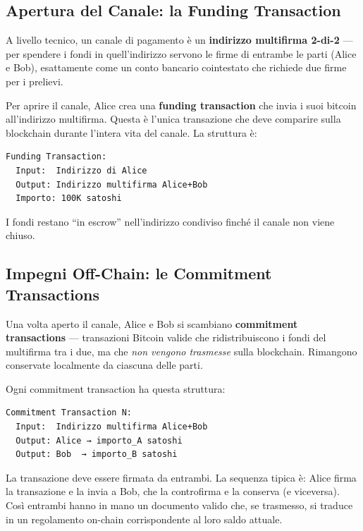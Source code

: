 \documentclass[
  italian,
  openany]{book}
\begin{document}
\subsection{Apertura del Canale: la Funding
Transaction}\label{apertura-del-canale-la-funding-transaction}

A livello tecnico, un canale di pagamento è un \textbf{indirizzo
multifirma 2-di-2} --- per spendere i fondi in quell'indirizzo servono
le firme di entrambe le parti (Alice e Bob), esattamente come un conto
bancario cointestato che richiede due firme per i prelievi.

Per aprire il canale, Alice crea una \textbf{funding transaction} che
invia i suoi bitcoin all'indirizzo multifirma. Questa è l'unica
transazione che deve comparire sulla blockchain durante l'intera vita
del canale. La struttura è:

\begin{verbatim}
Funding Transaction:
  Input:  Indirizzo di Alice
  Output: Indirizzo multifirma Alice+Bob
  Importo: 100K satoshi
\end{verbatim}

I fondi restano ``in escrow'' nell'indirizzo condiviso finché il canale
non viene chiuso.

\subsection{Impegni Off-Chain: le Commitment
Transactions}\label{impegni-off-chain-le-commitment-transactions}

Una volta aperto il canale, Alice e Bob si scambiano \textbf{commitment
transactions} --- transazioni Bitcoin valide che ridistribuiscono i
fondi del multifirma tra i due, ma che \emph{non vengono trasmesse}
sulla blockchain. Rimangono conservate localmente da ciascuna delle
parti.

Ogni commitment transaction ha questa struttura:

\begin{verbatim}
Commitment Transaction N:
  Input:  Indirizzo multifirma Alice+Bob
  Output: Alice → importo_A satoshi
  Output: Bob  → importo_B satoshi
\end{verbatim}

La transazione deve essere firmata da entrambi. La sequenza tipica è:
Alice firma la transazione e la invia a Bob, che la controfirma e la
conserva (e viceversa). Così entrambi hanno in mano un documento valido
che, se trasmesso, si traduce in un regolamento on-chain corrispondente
al loro saldo attuale.
\end{document}
